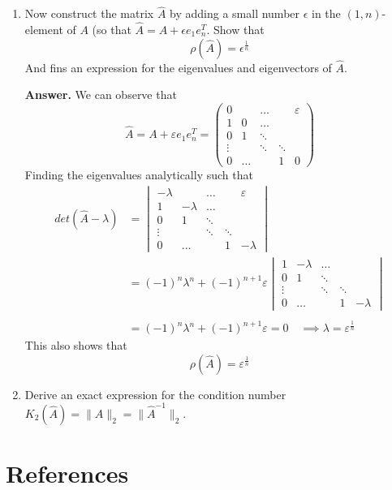 \documentclass{article}
\theoremstyle{remark}
\begin{document}
\begin{enumerate}[label=(\alph*)]
\begin{tcolorbox}
    \end{tcolorbox}
  \item  Now construct the matrix $\hat{A}$ by adding a small number $\epsilon $ in the $\left( 1, n \right)$- element of $A$ (so that $\hat{A} = A  +  \epsilon e_{1} e_{n}^{T} $. Show that \[
      \rho \left( \hat{A} \right) = \epsilon ^{\frac{1}{n} }
  \] 
  And fins an expression for the eigenvalues and eigenvectors of $\hat{A}$. 
  \begin{tcolorbox}
    \textbf{Answer.} 
    We can observe that \[
    \hat{A} = A + \varepsilon e_{1}e_{n}^{T} = \begin{pmatrix}
    0    &   &  \ldots           &    &  \varepsilon  \\
    1  & 0  &  \ldots \\
    0  &  1  & \ddots  \\
    \vdots   &   &  \ddots   &  \ddots   & \\
     0  &  \ldots  &   &  1  & 0
    \end{pmatrix} 
    \] 
    Finding the eigenvalues analytically such that \[
      \begin{split}
    det \left(  \hat{A} - \lambda \right)  & = \begin{vmatrix}
    -\lambda     &   &  \ldots           &    &  \varepsilon  \\
    1  & -\lambda   &  \ldots \\
    0  &  1  & \ddots  \\
    \vdots   &   &  \ddots   &  \ddots   & \\
     0  &  \ldots  &   &  1  & -\lambda 
    \end{vmatrix}  \\
    &=  \left( -1 \right)^{n} \lambda ^{n}  + \left( -1 \right)^{n+1}\varepsilon 
     \begin{vmatrix}
    1  & -\lambda   &  \ldots \\
    0  &  1  & \ddots  \\
    \vdots   &   &  \ddots   &  \ddots   & \\
     0  &  \ldots  &   &  1  & -\lambda 
    \end{vmatrix}  \\
     \\
     &=  \left( -1 \right)^{n} \lambda ^{n} + \left( -1 \right)^{n+1}\varepsilon  = 0 \quad       \implies  \lambda    = \varepsilon ^{\frac{1}{n}} 
      \end{split} 
    \] 
    This also shows that \[
    \rho \left( \hat{A} \right) = \varepsilon ^{\frac{1}{n}}
    \] 

  \end{tcolorbox}
\item Derive an exact expression for the condition number $K_{2} \left( \hat{A} \right) =  \|\hat{A}\|_{2}^{} = \|\hat{A}^{-1}\|_{2}^{}$.

  \end{enumerate}


\newpage
\section{References}%
\label{sec:references}



\end{document}
